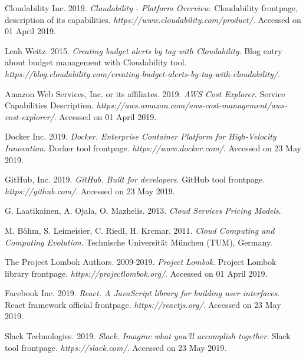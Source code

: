 \documentclass[licencjacka,en]{thesisclass}
\begin{document}
\begin{thebibliography}{99}
        Cloudability Inc. 2019.
        \textit{Cloudability - Platform Overview}.
        Cloudability frontpage, description of its capabilities.
        \textit{https://www.cloudability.com/product/}.
        Accessed on 01 April 2019.

        Leah Weitz. 2015.
        \textit{Creating budget alerts by tag with Cloudability}.
        Blog entry about budget management with Cloudability tool.
        \textit{https://blog.cloudability.com/creating-budget-alerts-by-tag-with-cloudability/}.

        Amazon Web Services, Inc. or its affiliates. 2019.
        \textit{AWS Cost Explorer}.
        Service Capabilities Description.
        \textit{https://aws.amazon.com/aws-cost-management/aws-cost-explorer/}.
        Accessed on 01 April 2019.

        Docker Inc. 2019.
        \textit{Docker. Enterprise Container Platform for High-Velocity Innovation}.
        Docker tool frontpage.
        \textit{https://www.docker.com/}.
        Accessed on 23 May 2019.

        GitHub, Inc. 2019.
        \textit{GitHub. Built for developers}.
        GitHub tool frontpage.
        \textit{https://github.com/}.
        Accessed on 23 May 2019.

        G. Laatikainen, A. Ojala, O. Mazhelis. 2013.
        \textit{Cloud Services Pricing Models}.

        M. Böhm, S. Leimeisier, C. Riedl, H. Krcmar. 2011.
        \textit{Cloud Computing and Computing Evolution}.
        Technische Universität München (TUM), Germany.

        The Project Lombok Authors. 2009-2019.
        \textit{Project Lombok}.
        Project Lombok library frontpage.
        \textit{https://projectlombok.org/}.
        Accessed on 01 April 2019.

        Facebook Inc. 2019.
        \textit{React. A JavaScript library for building user interfaces}.
        React framework official frontpage.
        \textit{https://reactjs.org/}.
        Accessed on 23 May 2019.

        Slack Technologies. 2019.
        \textit{Slack. Imagine what you’ll accomplish together}.
        Slack tool frontpage.
        \textit{https://slack.com/}.
        Accessed on 23 May 2019.


\end{thebibliography}
\end{document}
